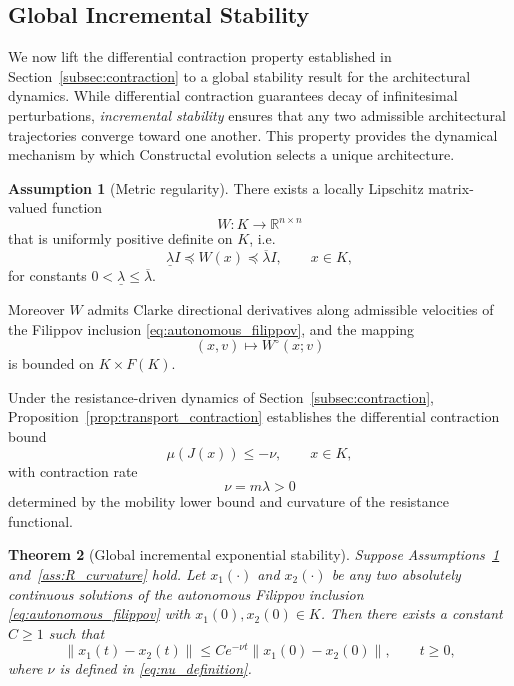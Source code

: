 \documentclass[12pt]{article}
\theoremstyle{plain}
\newtheorem{theorem}{Theorem}[section]
\theoremstyle{definition}
\newtheorem{assumption}[theorem]{Assumption}
\theoremstyle{remark}
\begin{document}
\subsection{Global Incremental Stability}
\label{subsec:global_incremental}

We now lift the differential contraction property established in
Section~\ref{subsec:contraction} to a global stability result for the
architectural dynamics.
While differential contraction guarantees decay of infinitesimal
perturbations, \emph{incremental stability} ensures that any two
admissible architectural trajectories converge toward one another.
This property provides the dynamical mechanism by which Constructal
evolution selects a unique architecture.

\begin{assumption}[Metric regularity]
\label{ass:metric_regular}
There exists a locally Lipschitz matrix-valued function
\[
W:K\rightarrow \mathbb{R}^{n\times n}
\]
that is uniformly positive definite on $K$, i.e.
\begin{equation}
\underline{\lambda} I
\preceq
W(x)
\preceq
\overline{\lambda} I,
\qquad x\in K,
\label{eq:uniform_metric_bounds}
\end{equation}
for constants $0<\underline{\lambda}\le\overline{\lambda}$.

Moreover $W$ admits Clarke directional derivatives along admissible
velocities of the Filippov inclusion \eqref{eq:autonomous_filippov},
and the mapping
\[
(x,v)\mapsto W^{\circ}(x;v)
\]
is bounded on $K\times F(K)$.
\end{assumption}

Under the resistance-driven dynamics of
Section~\ref{subsec:contraction},
Proposition~\ref{prop:transport_contraction}
establishes the differential contraction bound
\begin{equation}
\mu(J(x))\le -\nu,
\qquad x\in K,
\label{eq:weighted_contraction}
\end{equation}
with contraction rate
\begin{equation}
\nu = m\lambda >0
\label{eq:nu_definition}
\end{equation}
determined by the mobility lower bound and curvature of the resistance
functional.

\begin{theorem}[Global incremental exponential stability]
\label{thm:global_contraction}
Suppose Assumptions~\ref{ass:metric_regular}
and~\ref{ass:R_curvature} hold.
Let $x_1(\cdot)$ and $x_2(\cdot)$ be any two absolutely continuous
solutions of the autonomous Filippov inclusion
\eqref{eq:autonomous_filippov} with
$x_1(0),x_2(0)\in K$.
Then there exists a constant $C\ge1$ such that
\begin{equation}
\|x_1(t)-x_2(t)\|
\le
C e^{-\nu t}
\|x_1(0)-x_2(0)\|,
\qquad t\ge0,
\label{eq:incremental_convergence}
\end{equation}
where $\nu$ is defined in \eqref{eq:nu_definition}.
\end{theorem}
\end{document}
